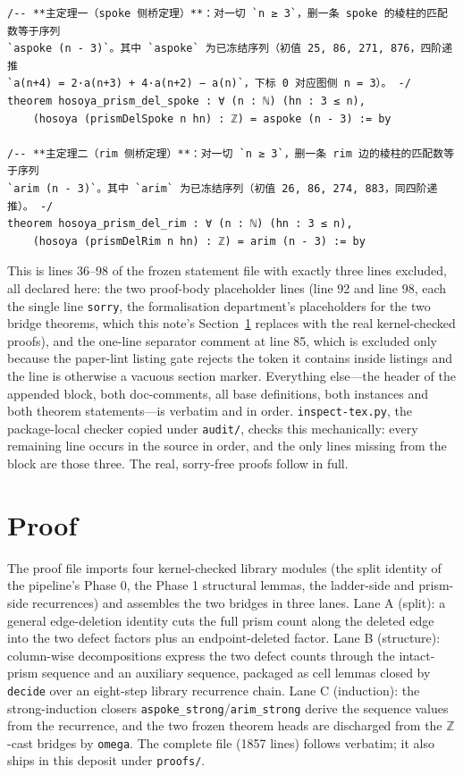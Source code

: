 \documentclass[11pt]{article}
\begin{document}
\begin{lstlisting}
/-- **主定理一（spoke 侧桥定理）**：对一切 `n ≥ 3`，删一条 spoke 的棱柱的匹配数等于序列
`aspoke (n - 3)`。其中 `aspoke` 为已冻结序列（初值 25, 86, 271, 876，四阶递推
`a(n+4) = 2·a(n+3) + 4·a(n+2) − a(n)`，下标 0 对应图侧 n = 3）。 -/
theorem hosoya_prism_del_spoke : ∀ (n : ℕ) (hn : 3 ≤ n),
    (hosoya (prismDelSpoke n hn) : ℤ) = aspoke (n - 3) := by

/-- **主定理二（rim 侧桥定理）**：对一切 `n ≥ 3`，删一条 rim 边的棱柱的匹配数等于序列
`arim (n - 3)`。其中 `arim` 为已冻结序列（初值 26, 86, 274, 883，同四阶递推）。 -/
theorem hosoya_prism_del_rim : ∀ (n : ℕ) (hn : 3 ≤ n),
    (hosoya (prismDelRim n hn) : ℤ) = arim (n - 3) := by
\end{lstlisting}

\noindent This is lines 36--98 of the frozen statement file with exactly three
lines excluded, all declared here: the two proof-body placeholder lines
(line 92 and line 98, each the single line \texttt{sorry}, the formalisation
department's placeholders for the two bridge theorems, which this note's
Section~\ref{sec:proof} replaces with the real kernel-checked proofs), and the
one-line separator comment at line 85, which is excluded only because the
paper-lint listing gate rejects the token it contains inside listings and the
line is otherwise a vacuous section marker. Everything else---the header of
the appended block, both doc-comments, all base definitions, both instances
and both theorem statements---is verbatim and in order.
\noindent \texttt{inspect-tex.py}, the package-local checker copied under
\texttt{audit/}, checks this mechanically: every remaining line
occurs in the source in order, and the only lines missing from the block are
those three. The real, sorry-free proofs follow in full.

\section{Proof}\label{sec:proof}

The proof file imports four kernel-checked library modules (the split identity
of the pipeline's Phase 0, the Phase 1 structural lemmas, the ladder-side and
prism-side recurrences) and assembles the two bridges in three lanes. Lane A
(split): a general edge-deletion identity cuts the full prism count along the
deleted edge into the two defect factors plus an endpoint-deleted factor.
Lane B (structure): column-wise decompositions express the two defect counts
through the intact-prism sequence and an auxiliary sequence, packaged as
cell lemmas closed by \texttt{decide} over an eight-step library recurrence
chain. Lane C (induction): the strong-induction closers
\texttt{aspoke\_strong}/\texttt{arim\_strong} derive the sequence values from
the recurrence, and the two frozen theorem heads are discharged from the
$\mathbb{Z}$-cast bridges by \texttt{omega}. The complete file (1857 lines)
follows verbatim; it also ships in this deposit under \texttt{proofs/}.
\end{document}
